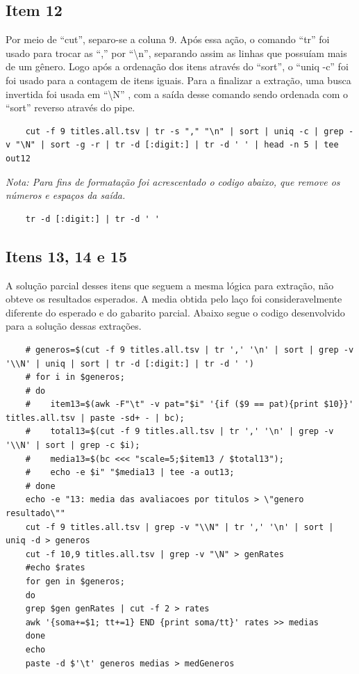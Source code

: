 \documentclass[12pt]{article}
\begin{document}
	\subsection*{Item 12}
	Por meio de ``cut'',  separo-se a coluna 9. Após essa ação, o comando ``tr''  foi usado para trocar as ``,'' por  ``\textbackslash n'', separando assim as linhas que possuíam mais de um gênero.  Logo após a ordenação dos itens através do ``sort'', o ``uniq -c'' foi  foi usado para a contagem de itens iguais.
	Para a finalizar a extração, uma busca invertida foi usada em ``\textbackslash N'' , com a saída desse comando sendo ordenada com o ``sort'' reverso através do pipe.
	\begin{verbatim}
	cut -f 9 titles.all.tsv | tr -s "," "\n" | sort | uniq -c | grep -v "\N" | sort -g -r | tr -d [:digit:] | tr -d ' ' | head -n 5 | tee out12
	\end{verbatim}
	\textit{Nota: Para fins de formatação foi acrescentado o codigo abaixo, que remove os números e espaços da saída.}
	\begin{verbatim}
	tr -d [:digit:] | tr -d ' '
	\end{verbatim}
	\subsection*{Itens 13, 14 e 15}
	A solução parcial desses itens que seguem a mesma lógica para extração, não obteve os resultados esperados. A media obtida pelo laço foi consideravelmente diferente do esperado e do gabarito parcial. Abaixo segue o codigo desenvolvido para a solução dessas extrações.
	\begin{verbatim}
	# generos=$(cut -f 9 titles.all.tsv | tr ',' '\n' | sort | grep -v '\\N' | uniq | sort | tr -d [:digit:] | tr -d ' ')
	# for i in $generos;
	# do
	#    item13=$(awk -F"\t" -v pat="$i" '{if ($9 == pat){print $10}}' titles.all.tsv | paste -sd+ - | bc);
	#    total13=$(cut -f 9 titles.all.tsv | tr ',' '\n' | grep -v '\\N' | sort | grep -c $i);
	#    media13=$(bc <<< "scale=5;$item13 / $total13");
	#    echo -e $i" "$media13 | tee -a out13;
	# done
	echo -e "13: media das avaliacoes por titulos > \"genero resultado\""
	cut -f 9 titles.all.tsv | grep -v "\\N" | tr ',' '\n' | sort | uniq -d > generos
	cut -f 10,9 titles.all.tsv | grep -v "\N" > genRates
	#echo $rates	
	for gen in $generos;
	do
	grep $gen genRates | cut -f 2 > rates
	awk '{soma+=$1; tt+=1} END {print soma/tt}' rates >> medias
	done
	echo
	paste -d $'\t' generos medias > medGeneros
	\end{verbatim}
\end{document}
